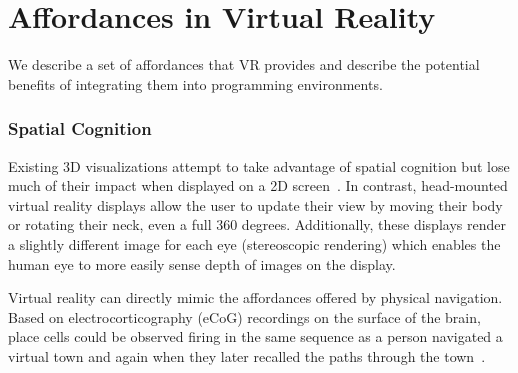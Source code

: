\documentclass[conference]{IEEEtran}
\begin{document}
\section{Affordances in Virtual Reality}
We describe a set of affordances that VR provides and describe the potential benefits of integrating them into programming environments.

\subsubsection{Spatial Cognition}

Existing 3D visualizations attempt to take advantage of spatial cognition but lose much of their impact when displayed on a 2D screen~\cite{Teyseyre:Overview3DSoftwareVisualization}.
In contrast, head-mounted virtual reality displays allow the user to update their view by moving their body or rotating their neck, even a full 360 degrees.
Additionally, these displays render a slightly different image for each eye (stereoscopic rendering) which enables the human eye to more easily sense depth of images on the display.

Virtual reality can directly mimic the affordances offered by physical navigation. Based on electrocorticography (eCoG) recordings on the surface of the brain, place cells could be observed firing in the same sequence as a person navigated a virtual town and again when they later recalled the paths through the town~\cite{Ekstrom:2003}.



\end{document}
